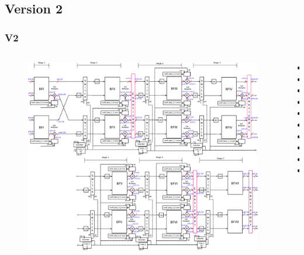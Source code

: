 \documentclass[t]{beamer}
\begin{document}
\subsection{Version 2}

\begin{frame}
\frametitle{V2}	
\begin{columns}[T] %
\begin{column}{.7\textwidth}
\vspace*{-0.9cm}
 \begin{figure}[ht]
    \centering
  \includegraphics[height=0.72\paperheight]{image/V2_esquema_p.eps} \\
    \end{figure}

\end{column}%

\begin{column}{.3\textwidth}


\begin{itemize}
\item
\item
\item
\item
\item
\item
\item
\item
\item
\item
\end{itemize}

\end{column}
\end{columns}

\end{frame}
\end{document}
